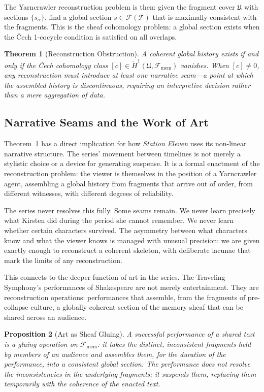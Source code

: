 \documentclass[12pt, oneside]{article}
\theoremstyle{plain}
\newtheorem{theorem}{Theorem}[section]
\newtheorem{proposition}[theorem]{Proposition}
\theoremstyle{definition}
\theoremstyle{remark}
\newcommand{\Sheaf}{\mathcal{F}}
\newcommand{\covers}{\mathfrak{U}}
\begin{document}
The Yarncrawler reconstruction problem is then: given the fragment
cover $\covers$ with sections $\{s_\alpha\}$, find a global section
$s \in \Sheaf(\mathcal{T})$ that is maximally consistent with the
fragments. This is the sheaf cohomology problem: a global section
exists when the \v{C}ech 1-cocycle condition is satisfied on all
overlaps.

\begin{theorem}[Reconstruction Obstruction]
\label{thm:reconstruction}
A coherent global history exists if and only if the \v{C}ech
cohomology class $[c] \in \check{H}^1(\covers, \Sheaf_{\mathrm{mem}})$
vanishes. When $[c] \neq 0$, any reconstruction must introduce at
least one \emph{narrative seam}---a point at which the assembled
history is discontinuous, requiring an interpretive decision rather
than a mere aggregation of data.
\end{theorem}

\subsection{Narrative Seams and the Work of Art}

Theorem~\ref{thm:reconstruction} has a direct implication for how
\textit{Station Eleven} uses its non-linear narrative structure. The
series' movement between timelines is not merely a stylistic choice
or a device for generating suspense. It is a formal enactment of the
reconstruction problem: the viewer is themselves in the position of
a Yarncrawler agent, assembling a global history from fragments that
arrive out of order, from different witnesses, with different degrees
of reliability.

The series never resolves this fully. Some seams remain. We never
learn precisely what Kirsten did during the period she cannot remember.
We never learn whether certain characters survived. The asymmetry
between what characters know and what the viewer knows is managed
with unusual precision: we are given exactly enough to reconstruct a
coherent skeleton, with deliberate lacunae that mark the limits of
any reconstruction.

This connects to the deeper function of art in the series. The
Traveling Symphony's performances of Shakespeare are not merely
entertainment. They are reconstruction operations: performances
that assemble, from the fragments of pre-collapse culture, a globally
coherent section of the memory sheaf that can be shared across an
audience.

\begin{proposition}[Art as Sheaf Gluing]
A successful performance of a shared text is a gluing operation on
$\Sheaf_{\mathrm{mem}}$: it takes the distinct, inconsistent
fragments held by members of an audience and assembles them, for
the duration of the performance, into a consistent global section.
The performance does not resolve the inconsistencies in the underlying
fragments; it suspends them, replacing them temporarily with the
coherence of the enacted text.
\end{proposition}
\end{document}
